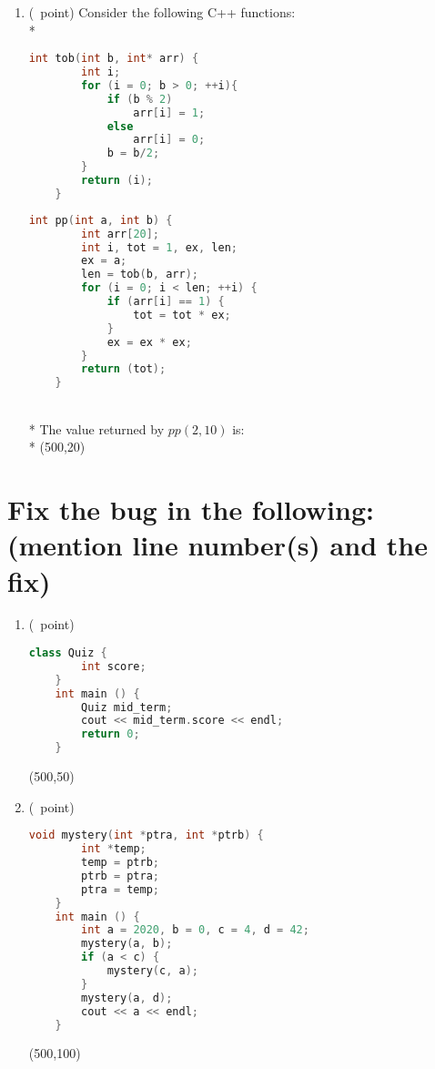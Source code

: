 \documentclass[14pt]{article}
\begin{document}
\begin{enumerate}[label=\alph*)]
    \item (\textonequarter\ point)
    Consider the following C++ functions: \\*
    \noindent\begin{minipage}{.45\textwidth}
    \begin{lstlisting}[language=C++, title={Part (d) - I}]
    int tob(int b, int* arr) {
        int i;
        for (i = 0; b > 0; ++i){
            if (b % 2) 
                arr[i] = 1;
            else
                arr[i] = 0;
            b = b/2;
        }
        return (i);
    }
    \end{lstlisting}
    \end{minipage}\hfill
    \begin{minipage}{.45\textwidth}
    \begin{lstlisting}[language=C++, title={Part (d) - II}]
    int pp(int a, int b) {
        int arr[20];
        int i, tot = 1, ex, len;
        ex = a;
        len = tob(b, arr);
        for (i = 0; i < len; ++i) {
            if (arr[i] == 1) {
                tot = tot * ex;
            }
            ex = ex * ex;
        }
        return (tot);
    }
    \end{lstlisting}
    \end{minipage}
    \\* The value returned by $pp(2, 10)$ is: \\*
    \framebox(500,20){}
\end{enumerate}

\section{Fix the bug in the following: (mention line number(s) and the fix)}
\begin{enumerate}[label=\alph*]
    \item (\textonequarter\ point)
    \begin{lstlisting}[language=C++, title={Part (a)}]
    class Quiz {
        int score;
    }
    int main () {
        Quiz mid_term;
        cout << mid_term.score << endl;
        return 0;
    }
    \end{lstlisting}
    \framebox(500,50){}
    
    \item (\textonequarter\ point)
    \begin{lstlisting}[language=C++, title={Part (b)}]
    void mystery(int *ptra, int *ptrb) {
        int *temp;
        temp = ptrb;
        ptrb = ptra;
        ptra = temp;
    }
    int main () {
        int a = 2020, b = 0, c = 4, d = 42;
        mystery(a, b);
        if (a < c) {
            mystery(c, a);
        }
        mystery(a, d);
        cout << a << endl;
    }
    \end{lstlisting}
    \framebox(500,100){}
    
\end{enumerate}
\end{document}
